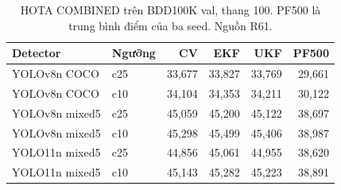 \begin{table}[htbp]\centering\small
\caption{HOTA COMBINED trên BDD100K val, thang 100. PF500 là trung bình điểm của ba seed. Nguồn R61.}\label{tab:bdd}
\begin{tabular}{llrrrr}\hline
Detector & Ngưỡng & CV & EKF & UKF & PF500\\\hline
YOLOv8n COCO & c25 & 33,677 & 33,827 & 33,769 & 29,661\\
YOLOv8n COCO & c10 & 34,104 & 34,353 & 34,211 & 30,122\\
YOLOv8n mixed5 & c25 & 45,059 & 45,200 & 45,122 & 38,697\\
YOLOv8n mixed5 & c10 & 45,298 & 45,499 & 45,406 & 38,987\\
YOLO11n mixed5 & c25 & 44,856 & 45,061 & 44,955 & 38,620\\
YOLO11n mixed5 & c10 & 45,143 & 45,282 & 45,223 & 38,891\\
\hline\end{tabular}\end{table}
